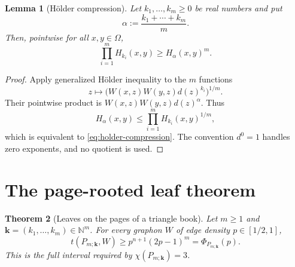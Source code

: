 \documentclass[11pt]{article}
\newtheorem{theorem}{Theorem}[section]
\newtheorem{lemma}[theorem]{Lemma}
\begin{document}
\begin{lemma}[H\"older compression]\label{lem:holder-compression}
Let $k_1,\ldots,k_m\geq0$ be real numbers and put
\[
 \alpha:=\frac{k_1+\cdots+k_m}{m}.
\]
Then, pointwise for all $x,y\in\Omega$,
\begin{equation}
 \prod_{i=1}^m H_{k_i}(x,y)\geq H_\alpha(x,y)^m.
 \label{eq:holder-compression}
\end{equation}
\end{lemma}

\begin{proof}
Apply generalized H\"older inequality to the $m$ functions
\[
 z\longmapsto
 \bigl(W(x,z)W(y,z)d(z)^{k_i}\bigr)^{1/m}.
\]
Their pointwise product is
$W(x,z)W(y,z)d(z)^\alpha$.  Thus
\[
 H_\alpha(x,y)
 \leq\prod_{i=1}^m H_{k_i}(x,y)^{1/m},
\]
which is equivalent to \eqref{eq:holder-compression}.  The convention
$d^0=1$ handles zero exponents, and no quotient is used.
\end{proof}


\section{The page-rooted leaf theorem}

\begin{theorem}[Leaves on the pages of a triangle book]
\label{thm:main}
Let $m\geq1$ and $\mathbf{k}=(k_1,\ldots,k_m)\in\mathbb N^m$.
For every graphon $W$ of edge density $p\in[1/2,1]$,
\[
 \boxed{
 t(P_{m;\mathbf{k}},W)
 \geq p^{n+1}(2p-1)^m
 =\Phi_{P_{m;\mathbf{k}}}(p).
 }
\]
This is the full interval required by
$\chi(P_{m;\mathbf{k}})=3$.
\end{theorem}
\end{document}
